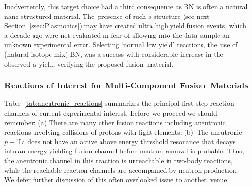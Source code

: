 \documentclass[particles,article,accept,pdftex,moreauthors]{Definitions/mdpi}
\begin{document}
Inadvertently, this target choice had a third consequence as BN is often a natural nano-structured material. The~presence of such a structure (see next Section~\ref{ssec:Plasmonics}) may have created ultra high yield fusion events, which a decade ago were not evaluated in fear of allowing into the data sample an unknown experimental error. Selecting `normal low yield' reactions, the~use of (natural isotope mix) BN, was a success with considerable increase in the observed $\alpha$ yield, verifying the proposed fusion~material.

\subsubsection{Reactions of Interest for Multi-Component Fusion~Materials}
Table~\ref{tab:aneutronic_reactions} summarizes the principal first step reaction channels of current experimental interest. Before~we proceed we should remember: (a) There are many other fusion reactions including aneutronic reactions involving collisions of protons with light elements; (b)~The aneutronic $p + {}^{7}\mathrm{Li}$ does not have an active above energy threshold resonance that decays into an energy yielding fusion channel before neutron removal is probable. Thus, the aneutronic channel in this reaction is unreachable in two-body reactions, while the reachable reaction channels are accompanied by neutron production. We defer further discussion of this often overlooked issue to another~venue.
\end{document}
